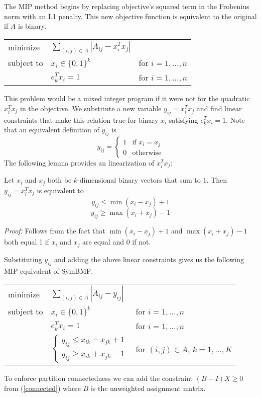 The MIP method begins by replacing objective's squared term in the
Frobenius norm with an L1 penalty. This new objective function is
equivalent to the original if $A$ is binary.
\begin{center}
\begin{tabular}{l l l}
minimize   & $\sum_{(i,j) \in A} |A_{ij} - x_i^T x_j|$ \\
subject to & $x_i \in \{0, 1\}^k$ & for $i = 1, ..., n$ \\
           & $e_k^T x_i = 1$ & for $i = 1, ..., n$
\end{tabular}
\end{center}
This problem would be a mixed integer program if it were not for the
quadratic $x_i^T x_j$ in the objective. We substitute a new variable
$y_{ij} = x_i^T x_j$ and find linear constraints that make this
relation true for binary $x_i$ satisfying $e_k^T x_i = 1$.
Note that an equivalent definition of
$y_{ij}$ is
\[ y_{ij} = \begin{cases}
  1 & \text{if } x_i = x_j \\
  0 & \text{otherwise}
\end{cases}\]
The following lemma provides an linearization of $x_i^T x_j$:

\begin{lemma}
Let $x_i$ and $x_j$ both be $k$-dimensional binary vectors that sum to 1.
Then $y_{ij} = x_i^T x_j$ is equivalent to
\[ y_{ij} \leq \min (x_i - x_j) + 1 \]
\[ y_{ij} \geq \max (x_i + x_j) - 1 \]

\textit{Proof:} Follows from the fact that $\min (x_i - x_j) + 1$ and
$\max (x_i + x_j) - 1$ both equal 1 if $x_i$ and $x_j$ are equal
and 0 if not.
\end{lemma}

Substituting $y_{ij}$ and adding the above linear constraints gives us
the following MIP equivalent of SymBMF.

\begin{center}
\begin{tabular}{l l l}
minimize   & $\sum_{(i,j) \in A} |A_{ij} - y_{ij}|$ \\
subject to & $x_i \in \{0, 1\}^k$ & for $i = 1, ..., n$ \\
           & $e_k^T x_i = 1$ & for $i = 1, ..., n$ \\
           & $\begin{cases}
             y_{ij} \leq x_{ik} - x_{jk} + 1 \\
             y_{ij} \geq x_{ik} + x_{jk} - 1
             \end{cases}$
           & for $(i,j) \in A$, $k = 1, ..., K$
\end{tabular}
\end{center}

To enforce partition connectedness we can add the constraint
$(B - I) X \geq 0$ from (\ref{connected}) where $B$ is the unweighted
assignment matrix.
